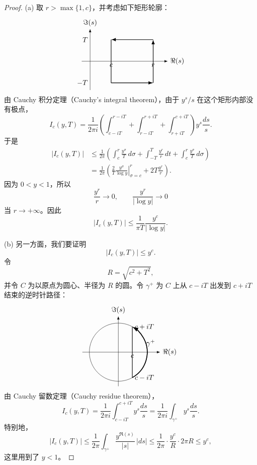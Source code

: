 \begin{proof}
	(a) 取 $r>\max\{1,c\}$，并考虑如下矩形轮廓：
	\[
	\begin{tikzpicture}[baseline={(current bounding box.center)}, >=Latex, x=1.05cm, y=0.9cm]
		\draw[->] (-0.4,0) -- (3.7,0) node[right] {$\Re(s)$};
		\draw[->] (0,-1.6) -- (0,1.8) node[above] {$\Im(s)$};
		\draw[thick, ->] (1,-1.2) -- (3,-1.2);
		\draw[thick, ->] (3,-1.2) -- (3,1.2);
		\draw[thick, ->] (3,1.2) -- (1,1.2);
		\draw[thick] (1,1.2) -- (1,-1.2);
		\node[below] at (1,0) {$c$};
		\node[below] at (3,0) {$r$};
		\node[left] at (0,1.2) {$T$};
		\node[left] at (0,-1.2) {$-T$};
	\end{tikzpicture}
	\]
	由 Cauchy 积分定理（Cauchy's integral theorem），由于 $y^s/s$ 在这个矩形内部没有极点，
	\[
		I_c(y,T)=
		\frac1{2\pi i}
		\left(
		\int_{c-iT}^{r-iT}
		+
		\int_{r-iT}^{r+iT}
		+
		\int_{r+iT}^{c+iT}
		\right)y^s\frac{ds}{s}.
	\]
	于是
	\[
	\begin{aligned}
		|I_c(y,T)|
		&\leq
		\frac1{2\pi}
		\left(
		\int_c^r\frac{y^\sigma}{T}\,d\sigma
		+
		\int_{-T}^T\frac{y^r}{r}\,dt
		+
		\int_c^r\frac{y^\sigma}{T}\,d\sigma
		\right)\\
		&=
		\frac1{2\pi}
		\left(
		\frac2T\left.\frac{y^\sigma}{\log y}\right|_{\sigma=c}^r
		+
		2T\frac{y^r}{r}
		\right).
	\end{aligned}
	\]
	因为 $0<y<1$，所以
	\[
		\frac{y^r}{r}\to 0,
		\qquad
		\frac{y^r}{|\log y|}\to 0
	\]
	当 $r\to+\infty$。因此
	\[
		|I_c(y,T)|
		\leq
		\frac1{\pi T}\frac{y^c}{|\log y|}.
	\]

	(b) 另一方面，我们要证明
	\[
		|I_c(y,T)|\leq y^c.
	\]
	令
	\[
		R=\sqrt{c^2+T^2},
	\]
	并令 $C$ 为以原点为圆心、半径为 $R$ 的圆。令 $\gamma^+$ 为 $C$ 上从 $c-iT$ 出发到 $c+iT$ 结束的逆时针路径：
	\[
	\begin{tikzpicture}[baseline={(current bounding box.center)}, >=Latex, x=1cm, y=1cm]
		\draw[->] (-1.8,0) -- (2.1,0) node[right] {$\Re(s)$};
		\draw[->] (0,-1.7) -- (0,1.8) node[above] {$\Im(s)$};
		\draw[thin] (0,0) circle (1.45);
		\draw[thick] (0.7,-1.27) -- (0.7,1.27);
		\draw[very thick, ->] (0.7,-1.27) arc[start angle=-61,end angle=61,radius=1.45];
		\node[right] at (0.7,1.27) {$c+iT$};
		\node[right] at (0.7,-1.27) {$c-iT$};
		\node[right] at (1.28,0.45) {$\gamma^+$};
		\node[below] at (0.7,0) {$c$};
	\end{tikzpicture}
	\]
	由 Cauchy 留数定理（Cauchy residue theorem），
	\[
		I_c(y,T)
		=
		\frac1{2\pi i}\int_{c-iT}^{c+iT}y^s\frac{ds}{s}
		=
		\frac1{2\pi i}\int_{\gamma^+}y^s\frac{ds}{s}.
	\]
	特别地，
	\[
		|I_c(y,T)|
		\leq
		\frac1{2\pi}\int_{\gamma^+}\frac{y^{\Re(s)}}{|s|}\,|ds|
		\leq
		\frac1{2\pi}\cdot \frac{y^c}{R}\cdot 2\pi R
		\leq y^c,
	\]
	这里用到了 $y<1$。


\end{proof}
